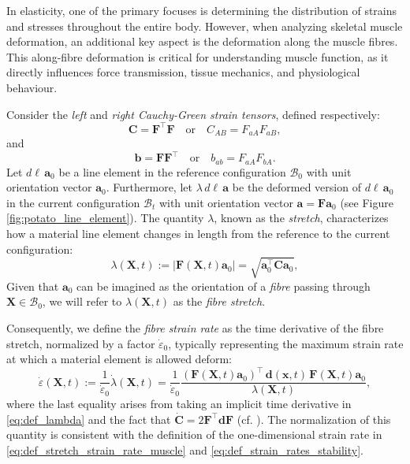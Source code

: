 \documentclass{sfuthesis}
\numberwithin{equation}{section}
\numberwithin{figure}{chapter}
\numberwithin{table}{chapter}
\theoremstyle{definition}
\def\*#1{{\mathbf{#1}}} %
\newcommand{\depsilon}{\dot{\varepsilon}}
\newcommand{\B}{\mathcal{B}}
\newcommand{\T}{\top}
\begin{document}
In elasticity, one of the primary focuses is determining the distribution of strains and stresses throughout the entire body. However, when analyzing skeletal muscle deformation, an additional key aspect is the deformation along the muscle fibres. This along-fibre deformation is critical for understanding muscle function, as it directly influences force transmission, tissue mechanics, and physiological behaviour. 

Consider the \textit{left} and \textit{right Cauchy-Green strain tensors}, defined respectively:
\begin{equation}
    \*C = \*F^\T \*F \quad \text{or} \quad C_{AB} = F_{aA} F_{aB},
\end{equation}
and
\begin{equation}
    \*b = \*F \*F^\T \quad \text{or} \quad b_{ab} = F_{aA} F_{bA}.
\end{equation}
Let $d\ell \,\*a_0$ be a line element in the reference configuration $\B_0$ with unit orientation vector $\*a_0$. Furthermore, let $\lambda \, d\ell \, \*a$ be the deformed version of $d\ell \,\*a_0$ in the current configuration $\B_t$ with unit orientation vector $\*a = \*F \*a_0$ (see Figure \ref{fig:potato_line_element}). The quantity $\lambda$, known as the \textit{stretch}, characterizes how a material line element changes in length from the reference to the current configuration:
\begin{equation} \label{eq:def_lambda}
\lambda(\*X,t) := |\*F(\*X,t) \*a_0| = \sqrt{\*a_0^\T \*C \*a_0},
\end{equation}
Given that $\*a_0$ can be imagined as the orientation of a \textit{fibre} passing through $\*X \in \B_0$, we will refer to $\lambda(\*X,t)$ as the \textit{fibre stretch}. 

Consequently, we define the \textit{fibre strain rate} as the time derivative of the fibre stretch, normalized by a factor $\depsilon_0$, typically representing the maximum strain rate at which a material element is allowed deform:
\begin{equation} \label{eq:def_epsilon}
\depsilon(\*X,t) := \dfrac{1}{\depsilon_0} \dot{\lambda}(\*X,t) = \dfrac{1}{\depsilon_0} \dfrac{(\*F(\*X,t)  \*a_0)^\T \, \*d(\*x,t)  \, \*F(\*X,t)  \*a_0}{\lambda(\*X,t)},
\end{equation}
where the last equality arises from taking an implicit time derivative in \eqref{eq:def_lambda} and the fact that $\dot{\*C} = 2\*F^\T \*d \*F$ (cf. \cite[Eq. (2.168)]{HolzapfelBook}). The normalization of this quantity is consistent with the definition of the one-dimensional strain rate in \eqref{eq:def_stretch_strain_rate_muscle} and \eqref{eq:def_strain_rates_stability}.
\end{document}
